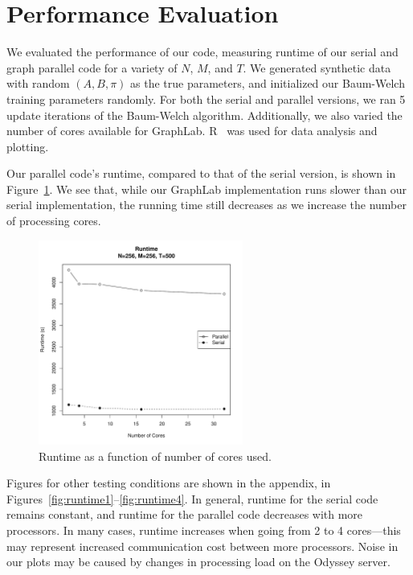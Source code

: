\section{Performance Evaluation}

We evaluated the performance of our code, measuring runtime of our serial and
graph parallel code for a variety of $N$, $M$, and $T$. We generated synthetic
data with random $(A, B, \pi)$ as the true parameters, and initialized our
Baum-Welch training parameters randomly. For both the serial and parallel
versions, we ran 5 update iterations of the Baum-Welch algorithm.  Additionally,
we also varied the number of cores available for GraphLab. R~\cite{r} was used
for data analysis and plotting. 

Our parallel code's runtime, compared to that of the serial version, is shown in
Figure~\ref{fig:runtime-256-500}. We see that, while our GraphLab implementation
runs slower than our serial implementation, the running time still decreases as
we increase the number of processing cores. 

\begin{figure}[htb]
    \centering
    \includegraphics[width=0.6\textwidth]{../figure/runtime-N_256-T_500.pdf}
    \caption{Runtime as a function of number of cores used.}
    \label{fig:runtime-256-500}
\end{figure}

Figures for other testing conditions are shown in the appendix, in
Figures~\ref{fig:runtime1}--\ref{fig:runtime4}. In general, runtime for the
serial code remains constant, and runtime for the parallel code decreases with
more processors. In many cases, runtime increases when going from 2 to 4
cores---this may represent increased communication cost between more processors.
Noise in our plots may be caused by changes in processing load on the Odyssey
server.

